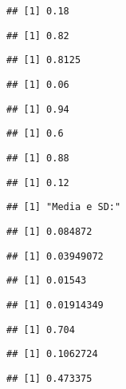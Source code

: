 \documentclass[
]{article}
\begin{document}
\begin{verbatim}
## [1] 0.18
\end{verbatim}

\begin{verbatim}
## [1] 0.82
\end{verbatim}

\begin{verbatim}
## [1] 0.8125
\end{verbatim}

\begin{verbatim}
## [1] 0.06
\end{verbatim}

\begin{verbatim}
## [1] 0.94
\end{verbatim}

\begin{verbatim}
## [1] 0.6
\end{verbatim}

\begin{verbatim}
## [1] 0.88
\end{verbatim}

\begin{verbatim}
## [1] 0.12
\end{verbatim}

\begin{verbatim}
## [1] "Media e SD:"
\end{verbatim}

\begin{verbatim}
## [1] 0.084872
\end{verbatim}

\begin{verbatim}
## [1] 0.03949072
\end{verbatim}

\begin{verbatim}
## [1] 0.01543
\end{verbatim}

\begin{verbatim}
## [1] 0.01914349
\end{verbatim}

\begin{verbatim}
## [1] 0.704
\end{verbatim}

\begin{verbatim}
## [1] 0.1062724
\end{verbatim}

\begin{verbatim}
## [1] 0.473375
\end{verbatim}
\end{document}
